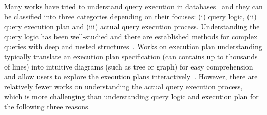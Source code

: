 Many works have tried to understand query execution in databases~\cite{koutrika2010explaining,gawade2012stethoscope,leventidis2020queryvis,danaparamita2011queryviz} and they can be classified into three categories depending on their focuses: (i) query logic, (ii) query execution plan and (iii) actual query execution process. Understanding the query logic has been well-studied and there are established methods for complex  queries with deep and nested structures~\cite{leventidis2020queryvis, danaparamita2011queryviz}. Works on execution plan understanding typically translate an execution plan specification (can contains up to thousands of lines) into intuitive diagrams (such as tree or graph) for easy comprehension and allow users to explore the execution plans interactively~\cite{simitsis2014vqa,moritz2015perfopticon}. However, there are relatively fewer works on understanding the actual query execution process, which is more challenging than understanding query logic and execution plan for the following three reasons.      


%
%


